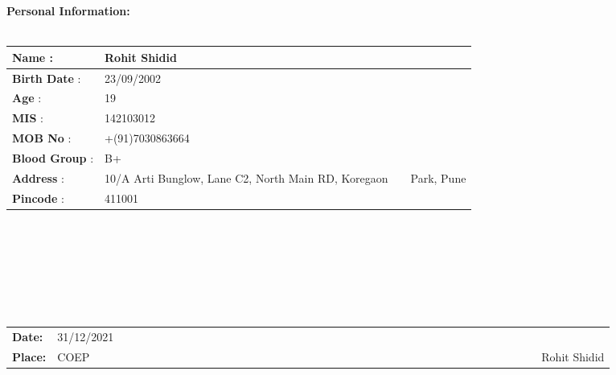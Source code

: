 \documentclass[12pt,a4paper]{article}
\begin{document}
\newpage 
\large{ \textbf{Personal Information:}} \\\

\begin{tabular}{||ll||}\hline\hline
\textbf{Name} : & Rohit Shidid \\ \hline
\textbf{Birth Date} : &23/09/2002  \\ \hline
\textbf{Age} : & 19\\ \hline
\textbf{MIS} : & 142103012 \\ \hline
\textbf{MOB No} : & +(91)7030863664  \\ \hline
\textbf{Blood Group} : & B+\\ \hline

\textbf{Address} :& 10/A Arti Bunglow, Lane C2, North Main RD, Koregaon&&Park, Pune  \\ \hline
\textbf{Pincode} :& 411001\\ \hline \hline
	
\end{tabular}
\ \\ \\ \\ \\ \\ \\ 

\begin{tabular}{llllr} 
\textbf{Date:} & 31/12/2021&&&
	\ \ \ \ \ \ \ \ \ \ \  \ \ \ \ \ \ \ \ \ \ \ \ \ \ \ \ \ \ \ \ \ \ \ \ \ \ \ \ \ \ \ \ \ \ \ \ \ \ \ \ \  \\
	\textbf{Place: }&COEP &&&&\ &&&& \ \ \ \ \ \ \ Rohit Shidid
\end{tabular}
\end{document}
